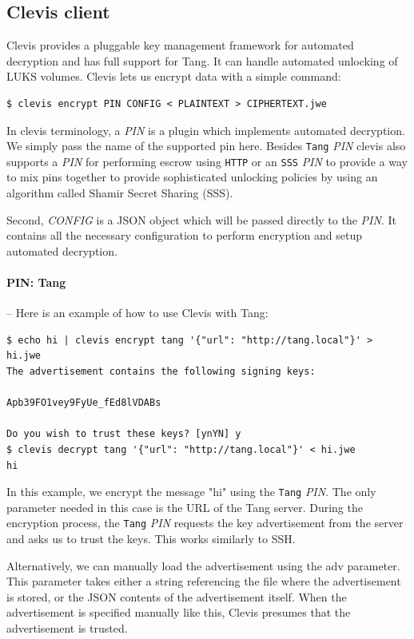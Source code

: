 \subsection{Clevis client}\label{clevis}

Clevis provides a pluggable key management framework for automated decryption and has full support for Tang.
It can handle automated unlocking of LUKS volumes.
Clevis lets us encrypt data with a simple command:
\begin{lstlisting}[columns=fixed,basicstyle=\ttfamily\footnotesize,tabsize=4,backgroundcolor=\color{yellow!10}]
$ clevis encrypt PIN CONFIG < PLAINTEXT > CIPHERTEXT.jwe
\end{lstlisting}
In clevis terminology, a {\it PIN} is a plugin which implements automated decryption.
We simply pass the name of the supported pin here.
Besides {\tt Tang} {\it PIN} clevis also supports a {\it PIN} for performing escrow using {\tt HTTP} or an {\tt SSS} {\it PIN} to provide a way to mix pins together to provide sophisticated unlocking policies by using an algorithm called Shamir Secret Sharing (SSS).%

Second, {\it CONFIG} is a JSON object which will be passed directly to the {\it PIN}.
It contains all the necessary configuration to perform encryption and setup automated decryption.


\paragraph{PIN: Tang} -- Here is an example of how to use Clevis with Tang:
\begin{lstlisting}[columns=fixed,basicstyle=\ttfamily\footnotesize,tabsize=4,backgroundcolor=\color{yellow!10}]
$ echo hi | clevis encrypt tang '{"url": "http://tang.local"}' > hi.jwe
The advertisement contains the following signing keys:

Apb39FO1vey9FyUe_fEd8lVDABs

Do you wish to trust these keys? [ynYN] y
$ clevis decrypt tang '{"url": "http://tang.local"}' < hi.jwe
hi
\end{lstlisting}
In this example, we encrypt the message "hi" using the {\tt Tang} {\it PIN}.
The only parameter needed in this case is the URL of the Tang server.
During the encryption process, the {\tt Tang} {\it PIN} requests the key advertisement from the server and asks us to trust the keys.
This works similarly to SSH.

Alternatively, we can manually load the advertisement using the adv parameter.
This parameter takes either a string referencing the file where the advertisement is stored, or the JSON contents of the advertisement itself.
When the advertisement is specified manually like this, Clevis presumes that the advertisement is trusted.



